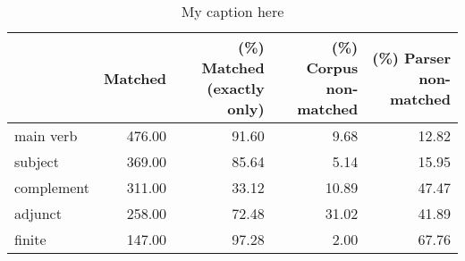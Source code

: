\begin{table}[!ht]
\centering
\begin{tabular}{lrrrr}
\toprule
{} &  Matched &  (\%) Matched (exactly only) &  (\%) Corpus non-matched &  (\%) Parser non-matched \\
\midrule
main verb  &   476.00 &                       91.60 &                    9.68 &                   12.82 \\
subject    &   369.00 &                       85.64 &                    5.14 &                   15.95 \\
complement &   311.00 &                       33.12 &                   10.89 &                   47.47 \\
adjunct    &   258.00 &                       72.48 &                   31.02 &                   41.89 \\
finite     &   147.00 &                       97.28 &                    2.00 &                   67.76 \\
\bottomrule
\end{tabular}
\caption{My caption here}
\label{tab:unit-elements-mood-relative}
\end{table}